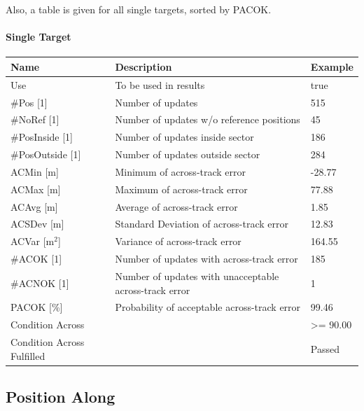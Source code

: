 Also, a table is given for all single targets, sorted by PACOK.

\paragraph{Single Target}

\begin{center}
 \begin{table}[H]
  \begin{tabularx}{\textwidth}{ | l | X |  l | }
    \hline
    \textbf{Name} & \textbf{Description} & \textbf{Example} \\ \hline
    Use & To be used in results & true \\ \hline
    \#Pos [1] & Number of updates & 515 \\ \hline
    \#NoRef [1] & Number of updates w/o reference positions & 45 \\ \hline
    \#PosInside [1] & Number of updates inside sector & 186 \\ \hline
    \#PosOutside [1] & Number of updates outside sector & 284 \\ \hline
    ACMin [m] & Minimum of across-track error & -28.77 \\ \hline
    ACMax [m] & Maximum of across-track error & 77.88 \\ \hline
    ACAvg [m] & Average of across-track error & 1.85 \\ \hline
    ACSDev [m] & Standard Deviation of across-track error & 12.83 \\ \hline
    ACVar [m$^2$] & Variance of across-track error & 164.55 \\ \hline
    \#ACOK [1] & Number of updates with across-track error & 185 \\ \hline
    \#ACNOK [1] & Number of updates with unacceptable across-track error  & 1 \\ \hline
    PACOK [\%] & Probability of acceptable across-track error & 99.46 \\ \hline
    Condition Across &  & >= 90.00 \\ \hline
    Condition Across Fulfilled &  & Passed \\ \hline
\end{tabularx}
\end{table}
\end{center}

\subsection{Position Along}
\label{sec:eval_req_pos_along} 

